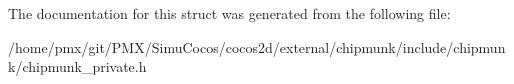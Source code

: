 The documentation for this struct was generated from the following file\+:\begin{DoxyCompactItemize}
\item 
/home/pmx/git/\+P\+M\+X/\+Simu\+Cocos/cocos2d/external/chipmunk/include/chipmunk/chipmunk\+\_\+private.\+h\end{DoxyCompactItemize}
